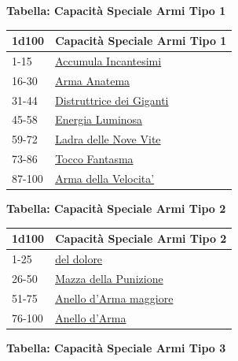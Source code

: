 \begin{multicols}{2}
{\textbf{Tabella: Capacità Speciale Armi Tipo 1}\hypertarget{Capacità Speciale Armi Tipo 1}{}

\medskip

{\small \begin{tabularx}{\linewidth}{ll}
		\toprule
\rowcolor{gray!20}\textbf{1d100} & \textbf{Capacità Speciale Armi Tipo 1}\\
\toprule
1-15 &\hyperlink{Accumula Incantesimi}{Accumula Incantesimi}\\
\rowcolor{gray!20}16-30 &\hyperlink{Arma Anatema}{Arma Anatema}\\
31-44 & \hyperlink{Distruttrice dei Giganti}{Distruttrice dei Giganti}\\
\rowcolor{gray!20}45-58 & \hyperlink{Energia Luminosa}{Energia Luminosa}\\
59-72 & \hyperlink{Ladra delle NoveVite}{Ladra delle Nove Vite}\\
\rowcolor{gray!20}73-86 & \hyperlink{Tocco Fantasma}{Tocco Fantasma}\\
87-100 & \hyperlink{Arma della Velocita'}{Arma della Velocita'}\\
\end{tabularx}
}
\medskip


\textbf{Tabella: Capacità Speciale Armi Tipo 2}\hypertarget{Capacità Speciale Armi Tipo 2}{}

\medskip
{\small \begin{tabularx}{\linewidth}{ll}
		\toprule
\rowcolor{gray!20}\textbf{1d100} & \textbf{Capacità Speciale Armi Tipo 2}\\
\toprule
1-25 & \hyperlink{deldolore}{del dolore}\\
\rowcolor{gray!20}26-50 & \hyperlink{Mazza della Punizione}{Mazza della Punizione}\\
51-75 & \hyperlink{Anello d'Arma maggiore}{Anello d'Arma maggiore}\\
\rowcolor{gray!20}76-100 & \hyperlink{Anello d'Arma}{Anello d'Arma}\\
\end{tabularx}}

\medskip

\textbf{Tabella: Capacità Speciale Armi Tipo 3}\hypertarget{Capacità Speciale Armi Tipo 3}{}

}
\end{multicols}
